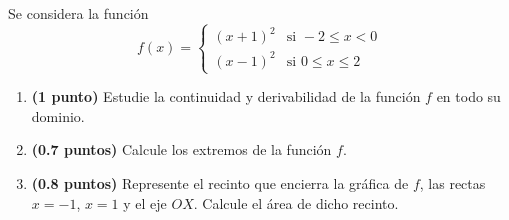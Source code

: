 
Se considera la función
\[
f(x)=\begin{cases}
(x+1)^2 & \text{si }-2\leq x<0\\
(x-1)^2 & \text{si }0\leq x\leq 2
\end{cases}
\]
\begin{enumerate}[label=\alph*)]
  \item \textbf{(1 punto)} Estudie la continuidad y derivabilidad de la
  función $f$ en todo su dominio.
  \item \textbf{(0.7 puntos)} Calcule los extremos de la función $f$.
  \item \textbf{(0.8 puntos)} Represente el recinto que encierra la gráfica
  de $f$, las rectas $x=-1$, $x=1$ y el eje $OX$. Calcule el área de dicho recinto.
\end{enumerate}
